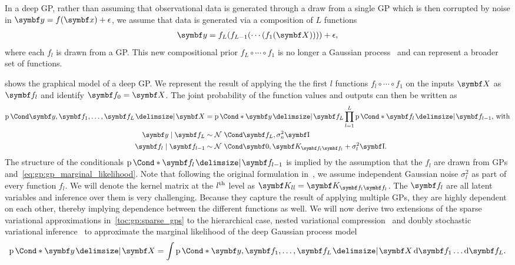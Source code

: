 In a deep GP, rather than assuming that observational data is generated through a draw from a single GP which is then corrupted by noise in $\mat{y} = f(\mat{x}) + \epsilon$, we assume that data is generated via a composition of $L$ functions
\begin{align}
    \begin{split}
        \mat{y} = f_L(f_{L-1}(\cdots(f_1(\mat{X})))) + \epsilon,
    \end{split}
\end{align}
where each $f_l$ is drawn from a GP.
This new compositional prior $f_L \circ \cdots \circ f_1$ is no longer a Gaussian process~\parencite{duvenaud_avoiding_2014} and can represent a broader set of functions.

 shows the graphical model of a deep GP.
We represent the result of applying the the first $l$ functions $f_l \circ \cdots \circ f_1$ on the inputs $\mat{X}$ as $\mat{f}_l$ and identify $\mat{f}_0 = \mat{X}$.
The joint probability of the function values and outputs can then be written as
\begin{align}
    \begin{split}
        \label{eq:dgp:full_model}
        \Prob{\mat{y}, \mat{f}_1, \dots, \mat{f}_L \given \mat{X}}
        &= \Prob*{\mat{y} \given \mat{f}_L} \prod_{l=1}^L \Prob*{\mat{f}_l \given \mat{f}_{l-1}}\text{, with} \\
        \mat{y} \mid \mat{f}_L &\sim \Gaussian{\mat{f}_L, \sigma^2_n \Eye} \\
        \mat{f}_l \mid \mat{f}_{l-1} &\sim \Gaussian{\mat{0}, \mat{K}_{\mat{f}_l\mat{f}_l} + \sigma^2_l \Eye}.
    \end{split}
\end{align}
The structure of the conditionals $\Prob*{\mat{f}_l \given \mat{f}_{l-1}}$ is implied by the assumption that the $f_l$ are drawn from GPs and~\cref{eq:gp:gp_marginal_likelihood}.
Note that following the original formulation in~\parencite{damianou_deep_2013}, we assume independent Gaussian noise $\sigma^2_l$ as part of every function $f_l$.
We will denote the kernel matrix at the $l^{\text{th}}$ level as $\mat{K}_{ll} = \mat{K}_{\mat{f}_l\mat{f}_l}$.
The $\mat{f}_l$ are all latent variables and inference over them is very challenging.
Because they capture the result of applying multiple GPs, they are highly dependent on each other, thereby implying dependence between the different functions as well.
We will now derive two extensions of the sparse variational approximations in~\cref{toc:gp:sparse_gps} to the hierarchical case, nested variational compression~\parencite{hensman_nested_2014} and doubly stochastic variational inference~\parencite{salimbeni_doubly_2017} to approximate the marginal likelihood of the deep Gaussian process model
\begin{align}
\begin{split}
    \label{eq:dgp:marginal_likelihood}
    \Prob*{\mat{y} \given \mat{X}} = \int \Prob*{\mat{y}, \mat{f}_1, \dots, \mat{f}_L \given \mat{X}} \diff \mat{f}_1 \dots \diff \mat{f}_L.
\end{split}
\end{align}


